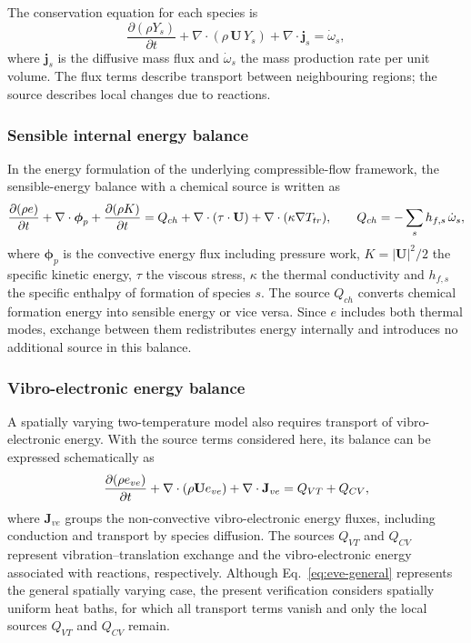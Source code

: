 The conservation equation for each species is
\begin{equation}
  \frac{\partial (\rho Y_s)}{\partial t}
  + \nabla\cdot(\rho\,\mathbf{U}\,Y_s)
  + \nabla\cdot\mathbf{j}_s = \dot\omega_s ,
\end{equation}
where $\mathbf{j}_s$ is the diffusive mass flux and $\dot\omega_s$ the mass
production rate per unit volume. The flux terms describe transport between
neighbouring regions; the source describes local changes due to reactions.

\subsubsection{Sensible internal energy balance}

In the energy formulation of the underlying compressible-flow framework,
the sensible-energy balance with a chemical source is written as
\begin{equation}
  \frac{\partial (\rho e)}{\partial t}
  + \nabla\cdot\boldsymbol\phi_p
  + \frac{\partial (\rho K)}{\partial t}
  = Q_{ch}
  + \nabla\cdot(\tau\cdot\mathbf{U})
  + \nabla\cdot(\kappa\nabla T_{tr}) ,
  \qquad
  Q_{ch} = -\sum_s h_{f,s}\,\dot\omega_s ,
\end{equation}
where $\boldsymbol\phi_p$ is the convective energy flux including pressure
work, $K = |\mathbf{U}|^2/2$ the specific kinetic energy, $\tau$ the viscous
stress, $\kappa$ the thermal conductivity and $h_{f,s}$ the specific enthalpy
of formation of species $s$. The source $Q_{ch}$ converts chemical formation
energy into sensible energy or vice versa. Since $e$ includes both thermal
modes, exchange between them redistributes energy internally and introduces
no additional source in this balance.

\subsubsection{Vibro-electronic energy balance}

A spatially varying two-temperature model also requires transport of
vibro-electronic energy. With the source terms considered here, its balance
can be expressed schematically as
\begin{equation}
  \frac{\partial (\rho e_{ve})}{\partial t}
  + \nabla\cdot(\rho\mathbf{U}e_{ve})
  + \nabla\cdot\mathbf{J}_{ve} = Q_{VT} + Q_{CV} ,
  \label{eq:eve-general}
\end{equation}
where $\mathbf{J}_{ve}$ groups the non-convective vibro-electronic energy
fluxes, including conduction and transport by species diffusion. The sources
$Q_{VT}$ and $Q_{CV}$ represent vibration--translation exchange and the
vibro-electronic energy associated with reactions, respectively. Although
Eq.~\eqref{eq:eve-general} represents the general spatially varying case,
the present verification considers spatially uniform heat baths, for which
all transport terms vanish and only the local sources $Q_{VT}$ and $Q_{CV}$
remain.

